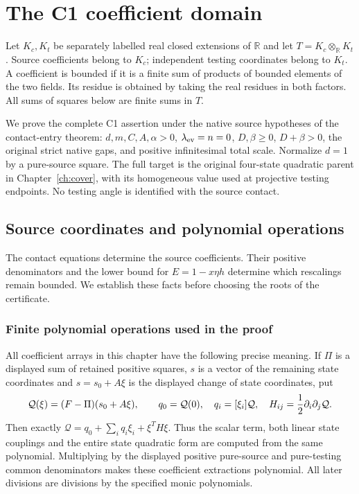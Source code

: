 \chapter{The C1 coefficient domain}
\label{ch:c1-short}

Let $K_c,K_t$ be separately labelled real closed extensions of
$\mathbb R$ and let $T=K_c\otimes_{\mathbb R}K_t$.
Source coefficients belong to $K_c$; independent testing coordinates
belong to $K_t$. A coefficient is bounded if it is a finite sum of
products of bounded elements of the two fields. Its residue is obtained
by taking the real residues in both factors. All sums of squares below
are finite sums in $T$.

We prove the complete C1 assertion under the native source hypotheses
of the contact-entry theorem: $d,m,C,A,\alpha>0$,
$\lambda_{\rm ev}=n=0$, $D,\beta\ge0$, $D+\beta>0$, the original
strict native gaps, and positive infinitesimal total scale. Normalize
$d=1$ by a pure-source square. The full target is the original
four-state quadratic parent in Chapter~\ref{ch:cover}, with its
homogeneous value used at projective testing endpoints.
No testing angle is identified with the source contact.

\section{Source coordinates and polynomial operations}
The contact equations determine the source coefficients. Their positive denominators and the lower bound for $E=1-x\eta h$ determine which rescalings remain bounded. We establish these facts before choosing the roots of the certificate.

\subsection{Finite polynomial operations used in the proof}
\label{sec:c1-finite-operations}

All coefficient arrays in this chapter have the following precise
meaning. If $\Pi$ is a displayed sum of retained positive squares,
$s$ is a vector of the remaining state coordinates and
$s=s_0+A\xi$ is the displayed change of state coordinates, put
\[
 \mathcal Q(\xi)=(F-\Pi)(s_0+A\xi),\qquad
 q_0=\mathcal Q(0),\quad q_i=[\xi_i]\mathcal Q,
 \quad H_{ij}={1\over2}\partial_i\partial_j\mathcal Q.
\]
Then exactly $\mathcal Q=q_0+\sum_i q_i\xi_i+\xi^TH\xi$.
Thus the scalar term, both linear state couplings and the entire state
quadratic form are computed from the same polynomial. Multiplying by the
displayed positive pure-source and pure-testing common denominators
makes these coefficient extractions polynomial. All later divisions
are divisions by the specified monic polynomials.

